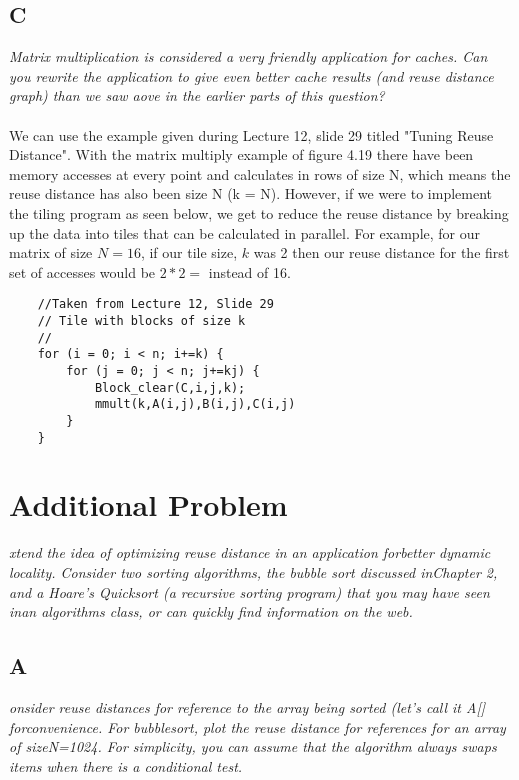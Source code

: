\documentclass[10pt]{article}
\begin{document}
\subsection{C}
\textit{Matrix multiplication is considered a very friendly application for caches. Can you
rewrite the application to give even better cache results (and reuse distance graph) than
we saw aove in the earlier parts of this question?}
\paragraph{} We can use the example given during Lecture 12, slide 29 titled "Tuning Reuse Distance". With the matrix multiply example of figure 4.19 there have been memory accesses at every point and calculates in rows of size N,
which means the reuse distance has also been size N (k = N). However, if we were to implement the tiling program as seen below, we get to reduce the reuse distance by breaking up the data into tiles that can be calculated in parallel. 
For example, for our matrix of size $N = 16$, if our tile size, $k$ was 2 then our reuse distance for the first set of accesses would be $2 * 2 = $ instead of 16. 

\begin{lstlisting}
    //Taken from Lecture 12, Slide 29  
    // Tile with blocks of size k
    //
    for (i = 0; i < n; i+=k) {
        for (j = 0; j < n; j+=kj) {
            Block_clear(C,i,j,k);
            mmult(k,A(i,j),B(i,j),C(i,j)
        }
    }
\end{lstlisting}

\section{Additional Problem}
\textit{xtend the idea of optimizing reuse distance in an application forbetter dynamic 
locality. Consider two sorting algorithms, the bubble sort discussed inChapter 2, and a 
Hoare’s Quicksort (a recursive sorting program) that you may have seen inan algorithms 
class, or can quickly find information on the web.}
\subsection{A}
\textit{onsider reuse distances for reference to the array being sorted (let’s call it A[]
 forconvenience. For bubblesort, plot the reuse distance for references for an array of 
 sizeN=1024. For simplicity, you can assume that the algorithm always swaps items when there 
 is a conditional test.}
\end{document}
